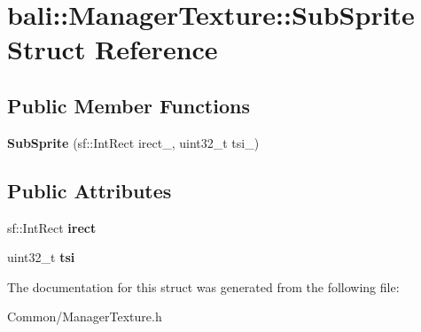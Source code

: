 \hypertarget{structbali_1_1_manager_texture_1_1_sub_sprite}{\section{bali\-:\-:Manager\-Texture\-:\-:Sub\-Sprite Struct Reference}
\label{structbali_1_1_manager_texture_1_1_sub_sprite}
}
\subsection*{Public Member Functions}
\begin{DoxyCompactItemize}
\item 
\hypertarget{structbali_1_1_manager_texture_1_1_sub_sprite_a0faea5ae2c85fe45da0f45dfaaf01005}{{\bfseries Sub\-Sprite} (sf\-::\-Int\-Rect irect\-\_\-, uint32\-\_\-t tsi\-\_\-)}\label{structbali_1_1_manager_texture_1_1_sub_sprite_a0faea5ae2c85fe45da0f45dfaaf01005}

\end{DoxyCompactItemize}
\subsection*{Public Attributes}
\begin{DoxyCompactItemize}
\item 
\hypertarget{structbali_1_1_manager_texture_1_1_sub_sprite_adfd6ce01f394b91350b2add7adeff188}{sf\-::\-Int\-Rect {\bfseries irect}}\label{structbali_1_1_manager_texture_1_1_sub_sprite_adfd6ce01f394b91350b2add7adeff188}

\item 
\hypertarget{structbali_1_1_manager_texture_1_1_sub_sprite_a3b34c20bcd3f7a0845f6df9a09bb837d}{uint32\-\_\-t {\bfseries tsi}}\label{structbali_1_1_manager_texture_1_1_sub_sprite_a3b34c20bcd3f7a0845f6df9a09bb837d}

\end{DoxyCompactItemize}


The documentation for this struct was generated from the following file\-:\begin{DoxyCompactItemize}
\item 
Common/Manager\-Texture.\-h\end{DoxyCompactItemize}
